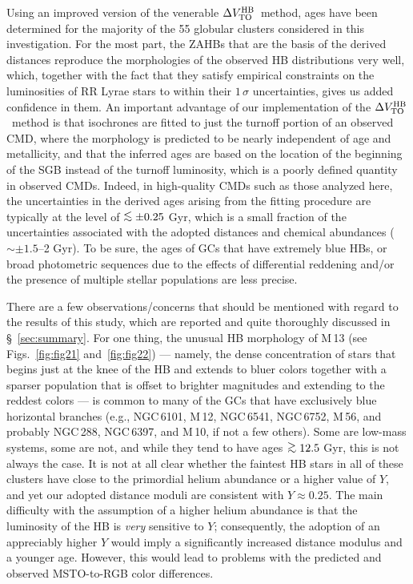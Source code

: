 \documentclass[12pt,preprint]{aastex}
\newcommand\delv{\Delta V^{\rm HB}_{\rm TO}}
\newcommand\lta{\mathrel{\hbox{\raise 0.6 ex \hbox{$<$}\kern
                   -1.8 ex\lower .5 ex\hbox{$\sim$}}}}
\newcommand\gta{\mathrel{\hbox{\raise 0.6 ex \hbox{$>$}\kern
                   -1.7 ex\lower .5 ex\hbox{$\sim$}}}}
\begin{document}
Using an improved version of the venerable $\delv$\ method, ages have been
determined for the majority of the 55 globular clusters considered in this
investigation.  For the most part, the ZAHBs that are the basis of the derived
distances reproduce the morphologies of the observed HB distributions very
well, which, together with the fact that they satisfy empirical constraints on
the luminosities of RR Lyrae stars to within their $1\,\sigma$ uncertainties,
gives us added confidence in them.  An important advantage of our implementation
of the $\delv$\ method is that isochrones are fitted to just the turnoff portion
of an observed CMD, where the morphology is predicted to be nearly independent
of age and metallicity, and that the inferred ages are based on the location of
the beginning of the SGB instead of the turnoff luminosity, which is a poorly
defined quantity in observed CMDs.  Indeed, in high-quality CMDs such as those
analyzed here, the uncertainties in the derived ages arising from the fitting
procedure are typically at the level of $\lta \pm 0.25$ Gyr, which is a small
fraction of the uncertainties associated with the adopted distances and chemical
abundances ($\sim \pm 1.5$--2 Gyr).  To be sure, the ages of GCs that have
extremely blue HBs, or broad photometric sequences due to the effects of
differential reddening and/or the presence of multiple stellar populations are
less precise.

There are a few observations/concerns that should be mentioned with regard to
the results of this study, which are reported and quite thoroughly discussed in
\S~\ref{sec:summary}.  For one thing, the unusual HB morphology of M$\,$13
(see Figs.~\ref{fig:fig21} and~\ref{fig:fig22}) --- namely, the dense
concentration of stars that begins just at the knee of the HB and extends to
bluer colors together with a sparser population that is offset to brighter
magnitudes and extending to the reddest colors --- is common to many of the GCs
that have exclusively blue horizontal branches (e.g., NGC$\,$6101, M$\,$12,
NGC$\,$6541, NGC$\,$6752, M$\,$56, and probably NGC$\,$288, NGC$\,$6397, and
M$\,$10, if not a few others).  Some are low-mass systems, some are not,
and while they tend to have ages $\gta 12.5$ Gyr, this is not always the case.
It is not at all clear whether the faintest HB stars in all of these clusters
have close to the primordial helium abundance or a higher value of $Y$, and yet
our adopted distance moduli are consistent with $Y \approx 0.25$.  The main
difficulty with the assumption of a higher helium abundance is that the
luminosity of the HB is {\it very} sensitive to $Y$; consequently, the adoption
of an appreciably higher $Y$ would imply a significantly increased distance
modulus and a younger age.  However, this would lead to problems with the
predicted and observed MSTO-to-RGB color differences.
\end{document}

